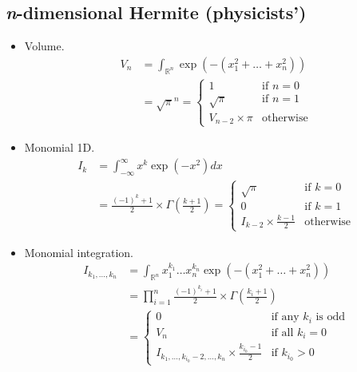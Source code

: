 \documentclass[draft]{scrartcl}
\begin{document}
\subsection*{\textit{n}-dimensional Hermite (physicists')}
\begin{itemize}
  \item Volume.
\[
  \begin{split}
  V_n
  &= \int_{\mathbb{R}^n} \exp\left(-(x_1^2+\dots+x_n^2)\right)\\
  &= \sqrt{\pi}^n
   = \begin{cases}
     1&\text{if $n=0$}\\
     \sqrt{\pi}&\text{if $n=1$}\\
     V_{n-2} \times \pi&\text{otherwise}
   \end{cases}
  \end{split}
\]
  \item Monomial 1D.
\begin{equation*}
  \begin{split}
    I_k
    &= \int_{-\infty}^\infty x^k \exp(-x^2) dx\\
    &= \frac{(-1)^k + 1}{2} \times \Gamma\left(\frac{k+1}{2}\right)
    = \begin{cases}
      \sqrt{\pi}&\text{if $k = 0$}\\
      0&\text{if $k = 1$}\\
      I_{k-2} \times \frac{k-1}{2}&\text{otherwise}
    \end{cases}
  \end{split}
\end{equation*}

  \item Monomial integration.
  \[
    \begin{split}
    I_{k_1,\dots,k_n}
    &= \int_{\mathbb{R}^n} x_1^{k_1}\dots x_n^{k_n} \exp(-(x_1^2+\dots+x_n^2))\\
    &= \prod_{i=1}^n \frac{(-1)^{k_i} + 1}{2} \times \Gamma\left(\frac{k_i+1}{2}\right)\\
    &=\begin{cases}
      0&\text{if any $k_i$ is odd}\\
      V_n&\text{if all $k_i=0$}\\
      I_{k_1,\dots,k_{i_0}-2,\dots,k_n} \times \frac{k_{i_0} - 1}{2}&\text{if $k_{i_0} > 0$}
    \end{cases}
    \end{split}
  \]
\end{itemize}
\end{document}

